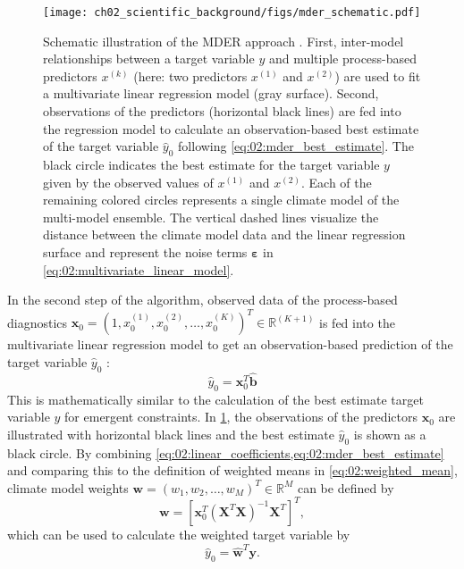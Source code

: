\begin{figure}[t]
  \centering
  \texttt{[image: 
    ch02\_scientific\_background/figs/mder\_schematic.pdf]}
  \caption{Schematic illustration of the \acf{MDER} approach
    \autocite{Karpechko2013}. First, inter-model relationships between a target
    variable $y$ and multiple process-based predictors $x^{(k)}$ (here: two
    predictors $x^{(1)}$ and $x^{(2)}$) are used to fit a multivariate linear
    regression model (gray surface). Second, observations of the predictors
    (horizontal black lines) are fed into the regression model to calculate an
    observation-based best estimate of the target variable $\hat{y}_0$
    following \cref{eq:02:mder_best_estimate}. The black circle indicates the
    best estimate for the target variable $y$ given by the observed values of
    $x^{(1)}$ and $x^{(2)}$. Each of the remaining colored circles represents
    a single climate model of the multi-model ensemble. The vertical dashed
    lines visualize the distance between the climate model data and the linear
    regression surface and represent the noise terms $\bm{\varepsilon}$ in
    \cref{eq:02:multivariate_linear_model}.}
  \label{fig:02:mder}
\end{figure}

In the second step of the algorithm, observed data of the process-based
diagnostics $\bm{x}_0 = \left( 1, x_0^{(1)}, x_0^{(2)}, \ldots, x_0^{(K)}
\right)^T \in \mathbb{R}^{(K + 1)}$ is fed into the multivariate linear
regression model to get an observation-based prediction of the target variable
$\hat{y}_0$
\autocite{Karpechko2013}:
\begin{equation}
  \hat{y}_0 = \bm{x}_0^T \hat{\bm{b}}
  \label{eq:02:mder_best_estimate}
\end{equation}
This is mathematically similar to the calculation of the best estimate target
variable $y$ for emergent constraints. In \cref{fig:02:mder}, the observations
of the predictors $\bm{x}_0$ are illustrated with horizontal black lines and
the best estimate $\hat{y}_0$ is shown as a black circle. By combining
\cref{eq:02:linear_coefficients,eq:02:mder_best_estimate} and comparing this to
the definition of weighted means in \cref{eq:02:weighted_mean}, climate model
weights $\bm{w} = \left( w_1, w_2, \ldots, w_M \right)^T \in \mathbb{R}^M$ can
be defined by
\begin{equation}
  \bm{w} = \left[ \bm{x}_0^T \left( \bm{X}^T \bm{X} \right)^{-1} \bm{X}^T
  \right]^T,
  \label{eq:02:mder_weights}
\end{equation}
which can be used to calculate the weighted target variable by
\begin{equation}
  \hat{y}_0 = \hat{\bm{w}}^T \bm{y}.
  \label{eq:02:weighted_mean_vector}
\end{equation}

